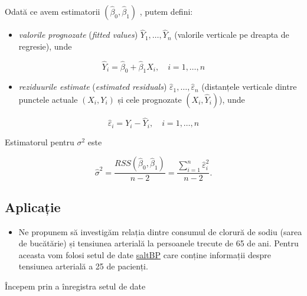\documentclass[]{article}
\providecommand{\tightlist}{%
  \setlength{\itemsep}{0pt}\setlength{\parskip}{0pt}}
\newenvironment{frshaded*}{%
  \def\FrameCommand{\fboxrule=\FrameRule\fboxsep=\FrameSep \fcolorbox{framecolor}{shadecolor1}}%
  \MakeFramed {\advance\hsize-\width \FrameRestore}}%
{\endMakeFramed}
\newenvironment{rmdblock}[1]
  {\begin{frshaded*}
  \begin{itemize}
  \renewcommand{\labelitemi}{
    \raisebox{-.7\height}[0pt][0pt]{
      {\setkeys{Gin}{width=2em,keepaspectratio}\texttt{[image: images/icons/\#1]}}
    }
  }
  \item
  }
  {
  \end{itemize}
  \end{frshaded*}
  }
\newenvironment{rmdexercise}
  {\begin{rmdblock}{exercise}}
  {\end{rmdblock}}
\begin{document}
Odată ce avem estimatorii \((\hat\beta_0,\hat\beta_1)\) , putem defini:

\begin{itemize}
\tightlist
\item
  \emph{valorile prognozate} (\emph{fitted values})
  \(\hat Y_1,\ldots,\hat Y_n\) (valorile verticale pe dreapta de
  regresie), unde
\end{itemize}

\[
\hat Y_i=\hat\beta_0+\hat\beta_1X_i,\quad i=1,\ldots,n
\]

\begin{itemize}
\tightlist
\item
  \emph{reziduurile estimate} (\emph{estimated residuals})
  \(\hat \varepsilon_1,\ldots,\hat \varepsilon_n\) (distanțele verticale
  dintre punctele actuale \((X_i,Y_i)\) și cele prognozate
  \((X_i,\hat Y_i)\)), unde
\end{itemize}

\[
\hat\varepsilon_i=Y_i-\hat Y_i,\quad i=1,\ldots,n
\]

Estimatorul pentru \(\sigma^2\) este

\[
\hat{\sigma}^2 = \frac{RSS(\hat{\beta}_0,\hat{\beta}_1)}{n-2} = \frac{\sum_{i=1}^{n}\hat{\varepsilon}_i^2}{n-2}.
\]

\subsection{Aplicație}\label{aplicatie}

\begin{rmdexercise}
Ne propunem să investigăm relația dintre consumul de clorură de sodiu
(sarea de bucătărie) și tensiunea arterială la persoanele trecute de 65
de ani. Pentru aceasta vom folosi setul de date
\href{dataIn/saltBP.txt}{saltBP} care conține informații despre
tensiunea arterială a 25 de pacienți.
\end{rmdexercise}

Începem prin a înregistra setul de date
\end{document}
